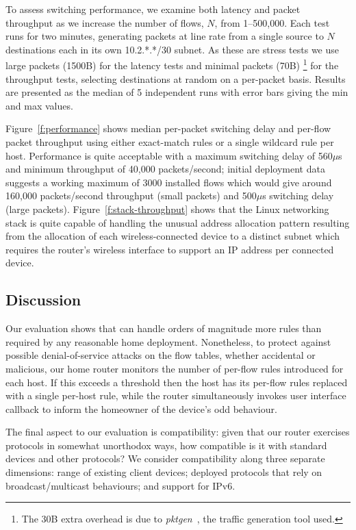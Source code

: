To assess switching performance, we examine both latency and packet throughput
as we increase the number of flows, $N$, from 1--500,000.  Each test runs for
two minutes, generating packets at line rate from a single source to $N$
destinations each in its own 10.2.*.*/30 subnet.  As these are stress tests we
use large packets (1500B) for the latency tests and minimal packets (70B)
\footnote{The 30B extra overhead is due to
  \emph{pktgen}~\cite{olsson05:_linux_packet_gener}, the traffic generation tool
  used.} for the throughput tests, selecting destinations at random on a
per-packet basis.  Results are presented as the median of 5 independent runs
with error bars giving the min and max values. 

Figure~\ref{f:performance} shows median per-packet switching delay and per-flow
packet throughput using either exact-match rules or a single wildcard rule per
host.  Performance is quite acceptable with a maximum switching delay of
560$\mu$s and minimum throughput of 40,000 packets/second; initial deployment
data suggests a working maximum of 3000 installed flows which would give around
160,000 packets/second throughput (small packets) and 500$\mu$s switching delay
(large packets).  Figure~\ref{f:stack-throughput} shows that the Linux
networking stack is quite capable of handling the unusual address allocation
pattern resulting from the allocation of each wireless-connected device to a
distinct subnet which requires the router's wireless interface to support an IP
address per connected device. 

\subsection{Discussion}

Our evaluation shows that \ovs can handle orders of magnitude more rules
than required by any reasonable home deployment.  Nonetheless, to protect
against possible denial-of-service attacks on the flow tables, whether
accidental or malicious, our home router monitors the number of
per-flow rules introduced for each host.  If this exceeds a threshold then
the host has its per-flow rules replaced with a single per-host rule, while the
router simultaneously invokes user interface callback to inform the homeowner of the
device's odd behaviour. 

The final aspect to our evaluation is compatibility: given that our router
exercises protocols in somewhat unorthodox ways, how compatible is it with
standard devices and other protocols?  We consider compatibility along three
separate dimensions: range of existing client devices; deployed protocols that
rely on broadcast/multicast behaviours; and support for IPv6. 

